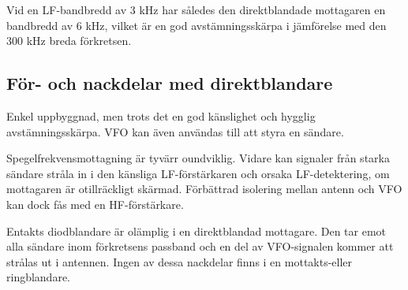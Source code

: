 Vid en LF-bandbredd av 3 kHz har således den direktblandade mottagaren
en bandbredd av 6 kHz, vilket är en god avstämningsskärpa i jämförelse
med den 300 kHz breda förkretsen.

\subsection{För- och nackdelar med direktblandare}

Enkel uppbyggnad, men trots det en god känslighet och hygglig
avstämningsskärpa.  VFO kan även användas till att styra en sändare.

Spegelfrekvensmottagning är tyvärr oundviklig. Vidare kan signaler
från starka sändare stråla in i den känsliga LF-förstärkaren och
orsaka LF-detektering, om mottagaren är otillräckligt
skärmad. Förbättrad isolering mellan antenn och VFO kan dock fås med
en HF-förstärkare.

Entakts diodblandare är olämplig i en direktblandad mottagare. Den tar
emot alla sändare inom förkretsens passband och en del av VFO-signalen
kommer att strålas ut i antennen. Ingen av dessa nackdelar finns i en
mottakts-eller ringblandare.
